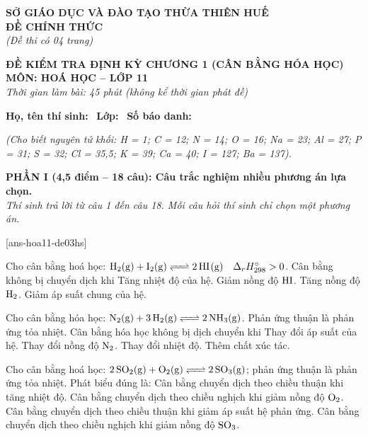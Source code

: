 \documentclass[12pt,a4paper]{article}
\begin{document}
\thispagestyle{firstpage}

\noindent
\begin{minipage}[t]{0.44\textwidth}
	\centering\fontsize{10pt}{12pt}\selectfont
	\textbf{SỞ GIÁO DỤC VÀ ĐÀO TẠO THỪA THIÊN HUẾ}\\
	\textbf{ĐỀ CHÍNH THỨC}\\
	\textit{(Đề thi có 04 trang)}
\end{minipage}\hfill
\begin{minipage}[t]{0.54\textwidth}
	\centering\small
	\textbf{ĐỀ KIỂM TRA ĐỊNH KỲ CHƯƠNG 1 (CÂN BẰNG HÓA HỌC)}\\
	\textbf{MÔN: HOÁ HỌC -- LỚP 11}\\
	\textit{Thời gian làm bài: 45 phút (không kể thời gian phát đề)}\\
\end{minipage}

\smallskip
\noindent\hrulefill
\smallskip

\noindent\textbf{Họ, tên thí sinh:} \dotfill\ \textbf{Lớp:} \dotfill\ \textbf{Số báo danh:} \dotfill

\smallskip
\noindent\textit{(Cho biết nguyên tử khối: H = 1; C = 12; N = 14; O = 16; Na = 23; Al = 27; P = 31; S = 32; Cl = 35,5; K = 39; Ca = 40; I = 127; Ba = 137).}
\smallskip

\noindent
\textbf{PHẦN I (4,5 điểm -- 18 câu): Câu trắc nghiệm nhiều phương án lựa chọn.}\\
\textit{Thí sinh trả lời từ câu 1 đến câu 18. Mỗi câu hỏi thí sinh chỉ chọn một phương án.}

[ans-hoa11-de03hs]

\begin{ex}
Cho cân bằng hoá học: $\ce{H2(g) + I2(g) <=> 2HI(g)} \quad \Delta_r H^\circ_{298} > 0$. Cân bằng không bị chuyển dịch khi
\choice
{Tăng nhiệt độ của hệ.}
{Giảm nồng độ $\ce{HI}$.}
{Tăng nồng độ $\ce{H2}$.}
{Giảm áp suất chung của hệ.}
\loigiai{}
\end{ex}

\begin{ex}
Cho cân bằng hóa học: $\ce{N2(g) + 3H2(g) <=> 2NH3(g)}$. Phản ứng thuận là phản ứng tỏa nhiệt. Cân bằng hóa học không bị dịch chuyển khi
\choice
{Thay đổi áp suất của hệ.}
{Thay đổi nồng độ $\ce{N2}$.}
{Thay đổi nhiệt độ.}
{Thêm chất xúc tác.}
\loigiai{}
\end{ex}

\begin{ex}
Cho cân bằng hoá học: $\ce{2SO2(g) + O2(g) <=> 2SO3(g)}$; phản ứng thuận là phản ứng tỏa nhiệt. Phát biểu đúng là:
\choice
{Cân bằng chuyển dịch theo chiều thuận khi tăng nhiệt độ.}
{Cân bằng chuyển dịch theo chiều nghịch khi giảm nồng độ $\ce{O2}$.}
{Cân bằng chuyển dịch theo chiều thuận khi giảm áp suất hệ phản ứng.}
{Cân bằng chuyển dịch theo chiều nghịch khi giảm nồng độ $\ce{SO3}$.}
\loigiai{}
\end{ex}
\end{document}
